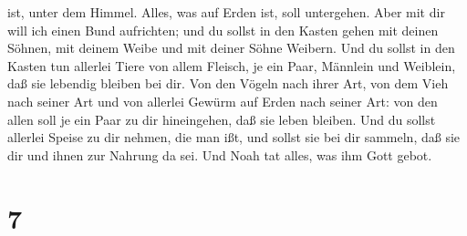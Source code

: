 ist, unter dem Himmel. Alles, was auf Erden ist, soll untergehen.
 Aber mit dir will ich einen Bund aufrichten; und du sollst
in den Kasten gehen mit deinen Söhnen, mit deinem Weibe und mit deiner
Söhne Weibern.  Und du sollst in den Kasten tun allerlei
Tiere von allem Fleisch, je ein Paar, Männlein und Weiblein, daß sie
lebendig bleiben bei dir.  Von den Vögeln nach ihrer Art,
von dem Vieh nach seiner Art und von allerlei Gewürm auf Erden nach
seiner Art: von den allen soll je ein Paar zu dir hineingehen, daß sie
leben bleiben.  Und du sollst allerlei Speise zu dir
nehmen, die man ißt, und sollst sie bei dir sammeln, daß sie dir und
ihnen zur Nahrung da sei.  Und Noah tat alles, was ihm Gott
gebot.

\hypertarget{section-6}{%
\section{7}\label{section-6}}

